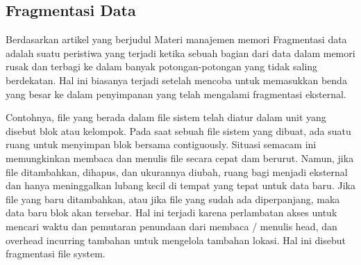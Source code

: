 \subsection{Fragmentasi Data}
Berdasarkan artikel yang berjudul Materi manajemen memori \cite{tawarmateri} Fragmentasi data adalah suatu peristiwa  yang terjadi ketika sebuah bagian dari data dalam memori rusak dan terbagi ke dalam banyak potongan-potongan yang tidak saling berdekatan. Hal ini biasanya terjadi setelah mencoba untuk memasukkan benda yang besar ke dalam penyimpanan yang telah mengalami fragmentasi eksternal.
    
Contohnya, file yang berada dalam file sistem telah diatur dalam unit yang disebut blok atau kelompok. Pada saat sebuah file sistem yang dibuat, ada suatu ruang untuk menyimpan blok bersama contiguously. Situasi semacam ini memungkinkan membaca dan menulis file secara cepat dam berurut. Namun, jika file ditambahkan, dihapus, dan ukurannya diubah, ruang bagi menjadi eksternal dan hanya meninggalkan lubang kecil di tempat yang tepat untuk data baru. Jika file yang baru ditambahkan, atau jika file yang sudah ada diperpanjang, maka data baru blok akan tersebar. Hal ini terjadi karena perlambatan akses untuk mencari waktu dan pemutaran penundaan dari membaca / menulis head, dan overhead incurring tambahan untuk mengelola tambahan lokasi. Hal ini disebut fragmentasi file system.
